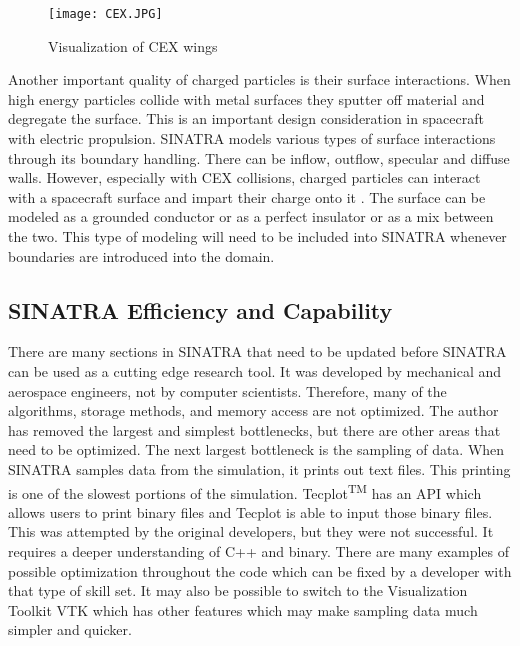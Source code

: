 \begin{figure}
\texttt{[image: CEX.JPG]}
\centering
\caption[Visualization of CEX wings]{Visualization of CEX wings \cite{cex_wings}}
\label{fig:CEX}
\end{figure}

\indent Another important quality of charged particles is their surface interactions. When high energy particles collide with metal surfaces they sputter off material and degregate the surface. This is an important design consideration in spacecraft with electric propulsion. SINATRA models various types of surface interactions through its boundary handling. There can be inflow, outflow, specular and diffuse walls. However, especially with CEX collisions, charged particles can interact with a spacecraft surface and impart their charge onto it \cite{surface_charge}. The surface can be modeled as a grounded conductor or as a perfect insulator or as a mix between the two. This type of modeling will need to be included into SINATRA whenever boundaries are introduced into the domain.

\subsection{SINATRA Efficiency and Capability}
\label{sec:auto_mesh}
There are many sections in SINATRA that need to be updated before SINATRA can be used as a cutting edge research tool. It was developed by mechanical and aerospace engineers, not by computer scientists. Therefore, many of the algorithms, storage methods, and memory access are not optimized. The author has removed the largest and simplest bottlenecks, but there are other areas that need to be optimized. The next largest bottleneck is the sampling of data. When SINATRA samples data from the simulation, it prints out text files. This printing is one of the slowest portions of the simulation. Tecplot\textsuperscript{TM} has an API which allows users to print binary files and Tecplot is able to input those binary files. This was attempted by the original developers, but they were not successful. It requires a deeper understanding of C++ and binary. There are many examples of possible optimization throughout the code which can be fixed by a developer with that type of skill set. It may also be possible to switch to the Visualization Toolkit VTK which has other features which may make sampling data much simpler and quicker. \par

